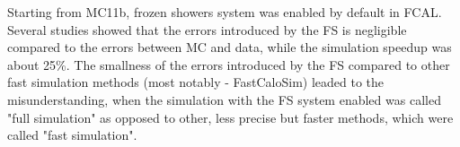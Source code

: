Starting from MC11b, frozen showers system was enabled by default in FCAL. Several studies showed that the errors introduced by the FS is negligible compared to the errors between MC and data, while the simulation speedup was about 25\%. The smallness of the errors introduced by the FS compared to other fast simulation methods (most notably - FastCaloSim) leaded to the misunderstanding, when the simulation with the FS system enabled was called "full simulation" as opposed to other, less precise but faster methods, which were called "fast simulation".
